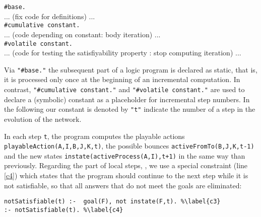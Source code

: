 \begin{tabbing}
\texttt{\#base.}  \\
... (fix code for definitions) ... \\
\texttt{\#cumulative constant.}  \\
... (code depending on constant: body iteration) ... \\
\texttt{\#volatile constant.} \\
... (code for testing the satisfiyability property : stop computing iteration) ...
\end{tabbing}

Via \texttt{"\#base."} the subsequent part of a logic program is declared as static, that is, it is processed only once at the beginning of an incremental computation. In contrast, \texttt{"\#cumulative constant."} and \texttt{"\#volatile constant."}  are used to declare a (symbolic) constant as a placeholder for incremental step numbers.
In the following our constant is denoted by \texttt{"t"} indicate the number of a step in the evolution of the network.

 
%
In each step \texttt{t}, the program computes the playable actions \texttt{playableAction(A,I,B,J,K,t)}, the possible bounces \texttt{activeFromTo(B,J,K,t-1)}
and the new states \texttt{instate(activeProcess(A,I),t+1)}
in the same way than previously.
Regarding the part of local steps, ,
we use a special constraint (line \ref{c4})
which states that the program should continue to the next step
while it is not satisfiable,
so that all answers that do not meet the goals are eliminated:
\begin{lstlisting}
notSatisfiable(t) :-  goal(F), not instate(F,t). %\label{c3}
:- notSatisfiable(t). %\label{c4}
\end{lstlisting}
